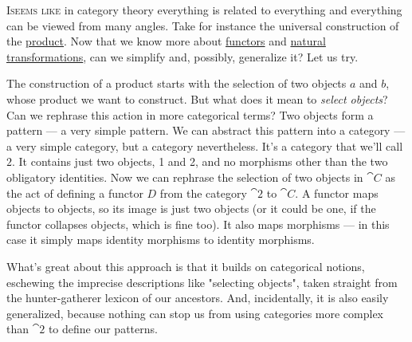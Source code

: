 \lettrine[lhang=0.17]{I}{seems like} in category theory everything is related to everything and
everything can be viewed from many angles. Take for instance the
universal construction of the \hyperref[products-and-coproducts]{product}.
Now that we know more about \hyperref[chap-functors]{functors} and
\hyperref[chap-natural-transformations]{natural transformations}, can we simplify and, possibly, generalize it? Let us
try.

\begin{figure}[H]
\centering
{}
\end{figure}

\noindent
The construction of a product starts with the selection of two objects
$a$ and $b$, whose product we want to construct. But what
does it mean to \emph{select objects}? Can we rephrase this action in
more categorical terms? Two objects form a pattern --- a very simple
pattern. We can abstract this pattern into a category --- a very simple
category, but a category nevertheless. It's a category that we'll call
$2$. It contains just two objects, 1 and 2, and no morphisms
other than the two obligatory identities. Now we can rephrase the
selection of two objects in $\cat{C}$ as the act of defining a functor $D$
from the category $\cat{2}$ to $\cat{C}$. A functor maps objects to
objects, so its image is just two objects (or it could be one, if the
functor collapses objects, which is fine too). It also maps morphisms
--- in this case it simply maps identity morphisms to identity
morphisms.

\begin{figure}[H]
\centering
{}
\end{figure}

\noindent
What's great about this approach is that it builds on categorical
notions, eschewing the imprecise descriptions like "selecting
objects", taken straight from the hunter-gatherer lexicon of our
ancestors. And, incidentally, it is also easily generalized, because
nothing can stop us from using categories more complex than $\cat{2}$
to define our patterns.

